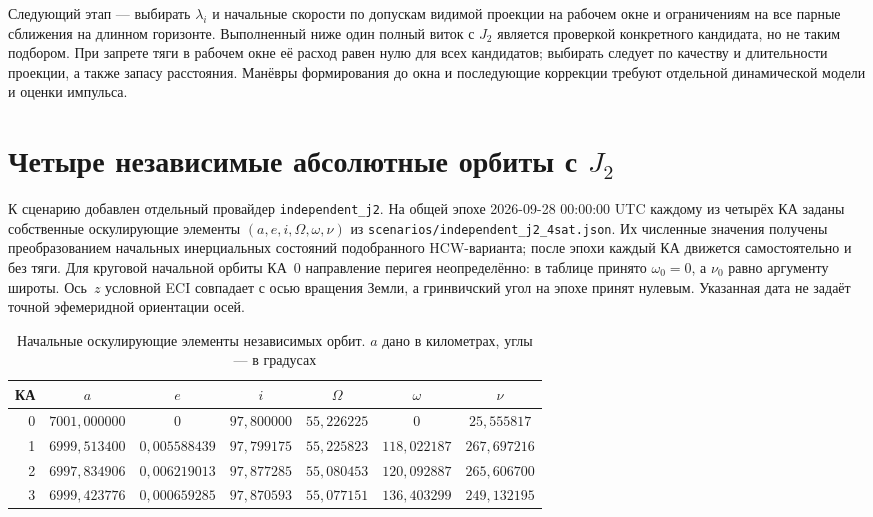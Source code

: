 \documentclass[a4paper,12pt]{article}
\begin{document}
Следующий этап --- выбирать $\lambda_i$ и начальные скорости
по допускам видимой проекции на рабочем окне и
ограничениям на все парные сближения на длинном горизонте.
Выполненный ниже один полный виток с $J_2$ является
проверкой конкретного кандидата, но не таким подбором.
При запрете тяги в рабочем окне её расход равен нулю
для всех кандидатов; выбирать следует по качеству и
длительности проекции, а также запасу расстояния.
Манёвры формирования до окна и последующие коррекции
требуют отдельной динамической модели и оценки импульса.

\section{Четыре независимые абсолютные орбиты с $J_2$}
\label{sec:j2_four_orbits}

К сценарию добавлен отдельный провайдер
\texttt{independent\_j2}. На общей эпохе
2026-09-28 00:00:00 UTC каждому из четырёх КА
заданы собственные оскулирующие элементы
$(a,e,i,\Omega,\omega,\nu)$ из
\texttt{scenarios/independent\_j2\_4sat.json}.
Их численные значения получены преобразованием
начальных инерциальных состояний подобранного
HCW-варианта; после эпохи каждый КА движется
самостоятельно и без тяги. Для круговой начальной
орбиты КА~0 направление перигея неопределённо:
в таблице принято $\omega_0=0$, а $\nu_0$
равно аргументу широты. Ось~$z$ условной ECI
совпадает с осью вращения Земли, а гринвичский
угол на эпохе принят нулевым. Указанная дата
не задаёт точной эфемеридной ориентации осей.

\begin{table}[htbp]
\centering\scriptsize
\caption{Начальные оскулирующие элементы независимых орбит.
$a$ дано в километрах, углы --- в градусах}
\label{tab:j2_elements}
\setlength{\tabcolsep}{5pt}
\begin{tabular}{rcccccc}
\toprule
КА & $a$ & $e$ & $i$ & $\Omega$ & $\omega$ & $\nu$\\
\midrule
0 & $7001{,}000000$ & $0$ & $97{,}800000$ & $55{,}226225$ & $0$ & $25{,}555817$\\
1 & $6999{,}513400$ & $0{,}005588439$ & $97{,}799175$ & $55{,}225823$ & $118{,}022187$ & $267{,}697216$\\
2 & $6997{,}834906$ & $0{,}006219013$ & $97{,}877285$ & $55{,}080453$ & $120{,}092887$ & $265{,}606700$\\
3 & $6999{,}423776$ & $0{,}000659285$ & $97{,}870593$ & $55{,}077151$ & $136{,}403299$ & $249{,}132195$\\
\bottomrule
\end{tabular}
\end{table}
\end{document}
